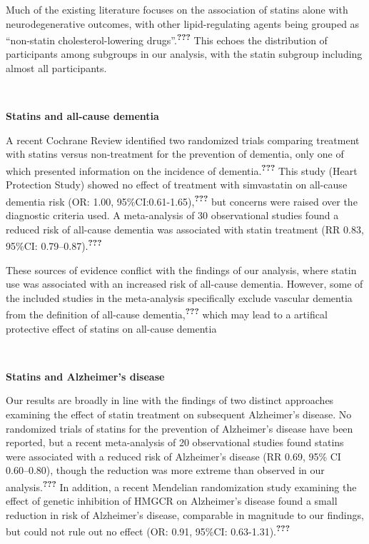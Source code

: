 \documentclass[a4paper, twoside]{templates/ociamthesis}
\begin{document}
Much of the existing literature focuses on the association of statins alone with neurodegenerative outcomes, with other lipid-regulating agents being grouped as ``non-statin cholesterol-lowering drugs''.\textsuperscript{{\textbf{???}}} This echoes the distribution of participants among subgroups in our analysis, with the statin subgroup including almost all participants.

~

\textbf{Statins and all-cause dementia}

A recent Cochrane Review identified two randomized trials comparing treatment with statins versus non-treatment for the prevention of dementia, only one of which presented information on the incidence of dementia.\textsuperscript{{\textbf{???}}} This study (Heart Protection Study) showed no effect of treatment with simvastatin on all-cause dementia risk (OR: 1.00, 95\%CI:0.61-1.65),\textsuperscript{{\textbf{???}}} but concerns were raised over the diagnostic criteria used. A meta-analysis of 30 observational studies found a reduced risk of all-cause dementia was associated with statin treatment (RR 0.83, 95\%CI: 0.79--0.87).\textsuperscript{{\textbf{???}}}

These sources of evidence conflict with the findings of our analysis, where statin use was associated with an increased risk of all-cause dementia. However, some of the included studies in the meta-analysis specifically exclude vascular dementia from the definition of all-cause dementia,\textsuperscript{{\textbf{???}}} which may lead to a artifical protective effect of statins on all-cause dementia

~

\textbf{Statins and Alzheimer's disease}

Our results are broadly in line with the findings of two distinct approaches examining the effect of statin treatment on subsequent Alzheimer's disease. No randomized trials of statins for the prevention of Alzheimer's disease have been reported, but a recent meta-analysis of 20 observational studies found statins were associated with a reduced risk of Alzheimer's disease (RR 0.69, 95\% CI 0.60--0.80), though the reduction was more extreme than observed in our analysis.\textsuperscript{{\textbf{???}}} In addition, a recent Mendelian randomization study examining the effect of genetic inhibition of HMGCR on Alzheimer's disease found a small reduction in risk of Alzheimer's disease, comparable in magnitude to our findings, but could not rule out no effect (OR: 0.91, 95\%CI: 0.63-1.31).\textsuperscript{{\textbf{???}}}
\end{document}
